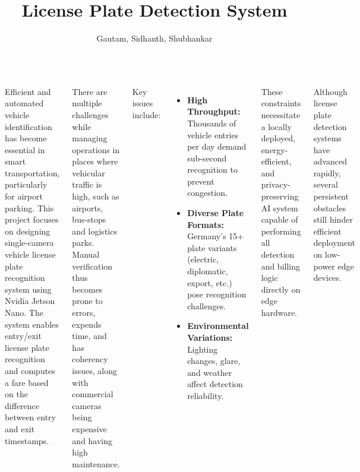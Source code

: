 \documentclass[25pt,a0paper,portrait]{tikzposter}
\title{License Plate Detection System}
\author{Gautam, Sidhanth, Shubhankar}
\begin{document}
	
	\maketitle
	
	\begin{columns}
		
		{
			{
				Efficient and automated vehicle identification has become essential in smart transportation, particularly for airport parking. This project focuses on designing
				single-camera vehicle license plate recognition system using Nvidia Jetson Nano.\newline \newline
				The system enables entry/exit license plate recognition and computes a fare based on the difference between entry and exit timestamps. \newline
				
				There are multiple challenges while managing operations in places where vehicular traffic is high, such as airports, bus-stops and logistics parks. Manual verification thus becomes prone to errors, expends time, and has coherency issues, along with commercial cameras being expensive and having high
				maintenance. \newline
				
				Key issues include:\newline
				\begin{itemize}
					\item \textbf{High Throughput:} Thousands of vehicle entries per day demand sub-second recognition to prevent congestion.
					\item \textbf{Diverse Plate Formats:} Germany’s 15+ plate variants (electric, diplomatic, export, etc.) pose recognition challenges.
					\item \textbf{Environmental Variations:} Lighting changes, glare, and weather affect detection reliability. \newline
				\end{itemize}
				
				These constraints necessitate a locally deployed, energy-efficient, and privacy-preserving AI system capable of performing all detection and billing logic directly on edge hardware.\newline
				
			}
			
			{
			Although license plate detection systems have advanced rapidly, several persistent obstacles still hinder efficient deployment on low-power edge devices.\newline
			
}}
\end{columns}
\end{document}
